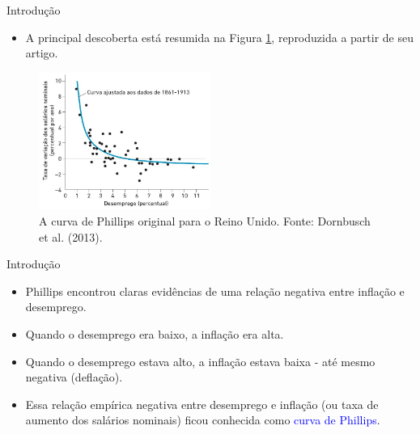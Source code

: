 \documentclass[10pt]{beamer}
\begin{document}
\begin{frame}{Introdução}
    \begin{itemize}
        \item A principal descoberta está resumida na Figura \ref{fig2}, reproduzida a partir de seu artigo.
    \end{itemize}
    \begin{figure}
        \centering
        \includegraphics[width=0.5\textwidth]{./figures/aula13_fig2.JPG}
        \caption{A curva de Phillips original para o Reino Unido. Fonte: Dornbusch et al. (2013).}
        \label{fig2}
    \end{figure}
\end{frame}

\begin{frame}{Introdução}
    \begin{itemize}
        \item Phillips encontrou claras evidências de uma relação negativa entre inflação e desemprego.
        \bigskip
        \item Quando o desemprego era baixo, a inflação era alta.
        \bigskip
        \item Quando o desemprego estava alto, a inflação estava baixa - até mesmo negativa (deflação).
        \bigskip
        \item Essa relação empírica negativa entre desemprego e inflação (ou taxa de aumento dos salários nominais) ficou conhecida como \textcolor{blue}{curva de Phillips}.
    \end{itemize}
\end{frame}
\end{document}
